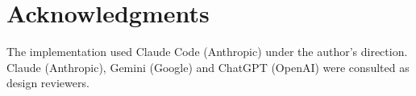 \section*{Acknowledgments}
The implementation used Claude Code (Anthropic) under the author's direction.
Claude (Anthropic), Gemini (Google) and ChatGPT (OpenAI) were consulted as design reviewers.
